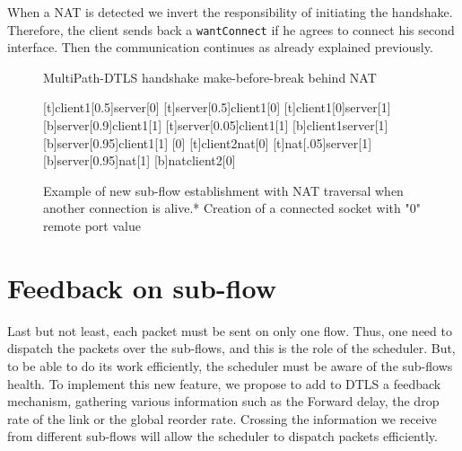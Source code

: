When a NAT is detected we invert the responsibility of initiating the handshake. Therefore, the client sends back a \texttt{wantConnect} if he agrees to connect his second interface. Then the communication continues as already explained previously. 

\begin{figure}[!h]
\centering
\begin{msc}[r]{MultiPath-DTLS handshake make-before-break behind NAT}

\setlength{\instfootheight}{0em}
\setlength{\instheadheight}{0em}
\setlength{\instdist}{0.25\linewidth}
\setlength{\levelheight}{3em}


[t]{client1}[0.5]{server}[0]
\nextlevel
{}[t]{server}[0.5]{client1}[0]
\nextlevel
{}[t]{client1}[0]{server}[1]
\nextlevel
{}[b]{server}[0.9]{client1}[1]
\nextlevel[2]
[t]{server}[0.05]{client1}[1]
\nextlevel
{}
[b]{client1}{server}[1]
\nextlevel
{}[b]{server}[0.95]{client1}[1]
\nextlevel
{}
[0]
\nextlevel
{}[t]{client2}{nat}[0]
[t]{nat}[.05]{server}[1]
\nextlevel
{}[b]{server}[0.95]{nat}[1]
\nextlevel
{}[b]{nat}{client2}[0]
\nextlevel[2]
\end{msc}
\caption[Example of new sub-flow establishment with NAT traversal]{Example of new sub-flow establishment with NAT traversal when another connection is alive.\newline{}* Creation of a connected socket with "0" remote port value }
\label{fig:HandshakeNAT}
\end{figure}

\newpage
\section{Feedback on sub-flow}
\label{sec:mpdtls-feedback}

Last but not least, each packet must be sent on only one flow. Thus, one need to dispatch the packets over the sub-flows, and this is the role of the scheduler. But, to be able to do its work efficiently, the scheduler must be aware of the sub-flows health. To implement this new feature, we propose to add to DTLS a feedback mechanism, gathering various information such as the Forward delay, the drop rate of the link or the global reorder rate. Crossing the information we receive from different sub-flows will allow the scheduler to dispatch packets efficiently.

